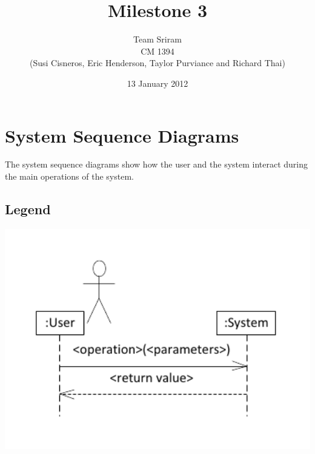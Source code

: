 \documentclass{article}
\begin{document}
\setlength{\voffset}{3.5in}
\title{Milestone 3}
\author{Team Sriram\\
CM 1394\\
(Susi Cisneros, Eric Henderson, Taylor Purviance and Richard Thai)}
\date{13 January 2012}
\maketitle
\clearpage
\setlength{\voffset}{0pt}
\section{System Sequence Diagrams}
The system sequence diagrams show how the user and the system interact during the main operations of the system.
\subsection{Legend}
\includegraphics[keepaspectratio, width=6in]{ssd_legend.pdf}\\
\end{document}
